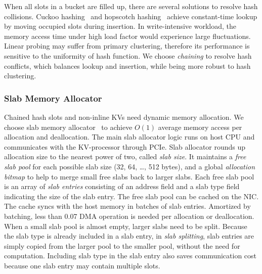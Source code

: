When all slots in a bucket are filled up, there are several solutions to resolve hash collisions.
Cuckoo hashing~\cite{pagh2004cuckoo} and hopscotch hashing~\cite{herlihy2008hopscotch} achieve constant-time lookup by moving occupied slots during insertion.
In write-intensive workload, the memory access time under high load factor would experience large fluctuations.
Linear probing may suffer from primary clustering, therefore its performance is sensitive to the uniformity of hash function.
We choose \textit{chaining} to resolve hash conflicts, which balances lookup and insertion, while being more robust to hash clustering.



\subsubsection{Slab Memory Allocator}
\label{sec:slab}

Chained hash slots and non-inline KVs need dynamic memory allocation.
We choose slab memory allocator~\cite{bonwick1994slab} to achieve $O(1)$ average memory access per allocation and deallocation. The main slab allocator logic runs on host CPU and communicates with the KV-processor through PCIe.
Slab allocator rounds up allocation size to the nearest power of two, called \textit{slab size}.
It maintains a \textit{free slab pool} for each possible slab size (32, 64, \ldots, 512 bytes), and a global \textit{allocation bitmap} to help to merge small free slabs back to larger slabs.
Each free slab pool is an array of \textit{slab entries} consisting of an address field and a slab type field indicating the size of the slab entry.
The free slab pool can be cached on the NIC. The cache syncs with the host memory in batches of slab entries. Amortized by batching, less than 0.07 DMA operation is needed per allocation or deallocation.
When a small slab pool is almost empty, larger slabs need to be split.
Because the slab type is already included in a slab entry, in \textit{slab splitting}, slab entries are simply copied from the larger pool to the smaller pool, without the need for computation.
Including slab type in the slab entry also saves communication cost because one slab entry may contain multiple slots.

